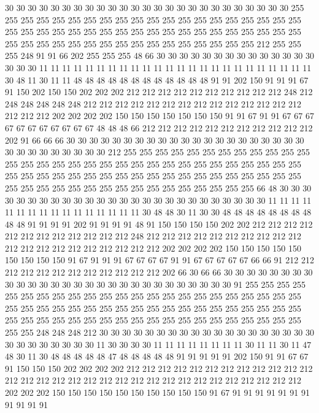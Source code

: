 30 30 30 30 30 30 30 30 30 30 30 30 30 30 30 30 30 30 30 30
30 30 30 30 30 255 255 255 255 255 255 255 255 255 255 255 255 255 255 255
255 255 255 255 255 255 255 255 255 255 255 255 255 255 255 255 255 255 255 255
255 255 255 255 255 255 255 255 255 255 255 255 255 255 255 255 255 255 255 255
212 255 255 255 248 91 91 66 202 255 255 255 48 66 30 30 30 30 30 30
30 30 30 30 30 30 30 30 30 30 30 11 11 11 11 11 11 11 11 11
11 11 11 11 11 11 11 11 11 11 11 11 11 11 11 30 48 11 30 11
11 48 48 48 48 48 48 48 48 48 48 48 48 91 91 202 150 91 91 91
67 91 150 202 150 150 202 202 202 212 212 212 212 212 212 212 212 212 212 248
212 248 248 248 248 248 212 212 212 212 212 212 212 212 212 212 212 212 212 212
212 212 212 202 202 202 202 150 150 150 150 150 150 150 91 91 67 91 91 67
67 67 67 67 67 67 67 67 67 67 48 48 48 66 212 212 212 212 212 212
212 212 212 212 212 202 91 66 66 66 30 30 30 30 30 30 30 30 30 30
30 30 30 30 30 30 30 30 30 30 30 30 30 30 30 30 30 30 30 30
212 255 255 255 255 255 255 255 255 255 255 255 255 255 255 255 255 255 255 255
255 255 255 255 255 255 255 255 255 255 255 255 255 255 255 255 255 255 255 255
255 255 255 255 255 255 255 255 255 255 255 255 255 255 255 255 255 255 255 255
255 255 255 255 255 255 255 66 48 30 30 30 30 30 30 30 30 30 30 30
30 30 30 30 30 30 30 30 30 30 30 30 30 30 30 11 11 11 11 11
11 11 11 11 11 11 11 11 11 11 11 30 48 48 30 11 30 30 48 48
48 48 48 48 48 48 48 48 91 91 91 91 202 91 91 91 91 48 91 150
150 150 150 202 202 212 212 212 212 212 212 212 212 212 212 212 212 248 212 212
212 212 212 212 212 212 212 212 212 212 212 212 212 212 212 212 212 212 202 202
202 202 150 150 150 150 150 150 150 150 150 91 67 91 91 91 67 67 67 67
91 91 67 67 67 67 67 66 66 91 212 212 212 212 212 212 212 212 212 212
212 212 202 66 30 66 66 30 30 30 30 30 30 30 30 30 30 30 30 30
30 30 30 30 30 30 30 30 30 30 30 30 30 30 30 91 255 255 255 255
255 255 255 255 255 255 255 255 255 255 255 255 255 255 255 255 255 255 255 255
255 255 255 255 255 255 255 255 255 255 255 255 255 255 255 255 255 255 255 255
255 255 255 255 255 255 255 255 255 255 255 255 255 255 255 255 255 255 255 248
248 248 212 30 30 30 30 30 30 30 30 30 30 30 30 30 30 30 30 30
30 30 30 30 30 30 30 30 30 30 11 30 30 30 30 11 11 11 11 11
11 11 11 30 11 11 30 11 47 48 30 11 30 48 48 48 48 48 47 48
48 48 48 48 91 91 91 91 91 202 150 91 91 67 67 91 150 150 150 202
202 202 202 212 212 212 212 212 212 212 212 212 212 212 212 212 212 212 212 212
212 212 212 212 212 212 212 212 212 212 212 212 212 212 202 202 202 150 150 150
150 150 150 150 150 150 150 91 67 91 91 91 91 91 91 91 91 91 91 91
